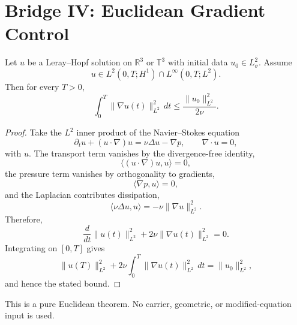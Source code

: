 \section{Bridge IV: Euclidean Gradient Control}

\begin{theorem}\label{prop:gradient-control}
Let \(u\) be a Leray--Hopf solution on \(\mathbb{R}^3\) or \(\mathbb{T}^3\) with
initial data \(u_0\in L^2_\sigma\). Assume
\[
u\in L^2(0,T;H^1)\cap L^\infty(0,T;L^2).
\]
Then for every \(T>0\),
\[
\int_0^T \|\nabla u(t)\|_{L^2}^2\,dt \le \frac{\|u_0\|_{L^2}^2}{2\nu}.
\]
\end{theorem}

\begin{proof}
Take the \(L^2\) inner product of the Navier--Stokes equation
\[
\partial_t u + (u\cdot\nabla)u = \nu \Delta u - \nabla p,
\qquad \nabla\cdot u=0,
\]
with \(u\). The transport term vanishes by the divergence-free identity,
\[
\langle (u\cdot\nabla)u,u\rangle=0,
\]
the pressure term vanishes by orthogonality to gradients,
\[
\langle \nabla p,u\rangle=0,
\]
and the Laplacian contributes dissipation,
\[
\langle \nu \Delta u,u\rangle=-\nu \|\nabla u\|_{L^2}^2.
\]
Therefore,
\[
\frac{d}{dt}\|u(t)\|_{L^2}^2 + 2\nu \|\nabla u(t)\|_{L^2}^2 = 0.
\]
Integrating on \([0,T]\) gives
\[
\|u(T)\|_{L^2}^2 + 2\nu \int_0^T \|\nabla u(t)\|_{L^2}^2\,dt = \|u_0\|_{L^2}^2,
\]
and hence the stated bound.
\end{proof}

This is a pure Euclidean theorem. No carrier, geometric, or modified-equation
input is used.
